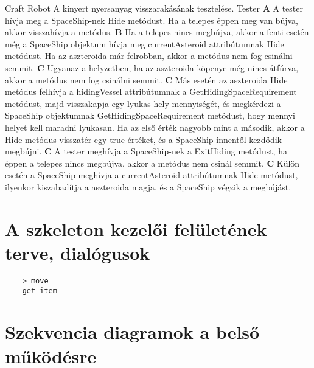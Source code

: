 \documentclass[../../projlab]{subfiles}
\begin{document}
\begin{use-case}
    {Craft Robot}
    {A kinyert nyersanyag visszarakásának tesztelése.}
    {Tester} 
    \textbf{A} A tester hívja meg a SpaceShip-nek Hide metódust. Ha a telepes éppen meg van bújva, akkor visszahívja a metódus. \newline
    \textbf{B} Ha a telepes nincs megbújva, akkor a fenti esetén még a SpaceShip objektum hívja meg currentAsteroid attribútumnak Hide metódust. Ha az aszteroida már felrobban, akkor a metódus nem fog csinálni semmit. \newline
    \textbf{C} Ugyanaz a helyzetben, ha az aszteroida köpenye még nincs átfúrva, akkor a metódus nem fog csinálni semmit. \newline
    \textbf{C} Más esetén az aszteroida Hide metódus felhívja a hidingVessel attribútumnak a GetHidingSpaceRequirement metódust, majd visszakapja egy lyukas hely mennyiségét, és megkérdezi a SpaceShip objektumnak GetHidingSpaceRequirement metódust, hogy mennyi helyet kell maradni lyukasan. Ha az első érték nagyobb mint a második, akkor a Hide metódus visszatér egy true értéket, és a SpaceShip innentől kezdődik megbújni. \newline
    \textbf{C} A tester meghívja a SpaceShip-nek a ExitHiding metódust, ha éppen a telepes nincs megbújva, akkor a metódus nem csinál semmit. \newline
    \textbf{C} Külön esetén a SpaceShip meghívja a currentAsteroid attribútumnak Hide metódust, ilyenkor kiszabadítja a aszteroida magja, és a SpaceShip végzik a megbújást. \newline
\end{use-case}

\section{A szkeleton kezelői felületének terve, dialógusok}



\begin{verbatim}
    > move
    get item
\end{verbatim}

\section{Szekvencia diagramok a belső működésre}
\end{document}
